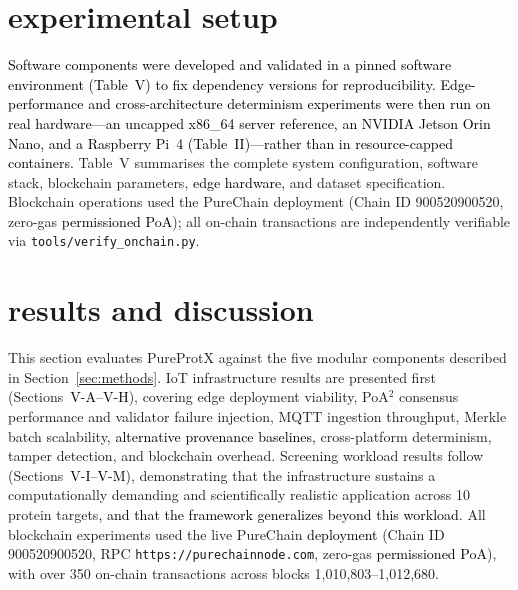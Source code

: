\documentclass[conference]{IEEEtran}
\begin{document}
\begin{table}[!htbp]
{\begin{tabular}{p{2.6cm} p{2.8cm} p{4.5cm}}
\bottomrule
\end{tabular}}
\end{table}
\section{\textbf{experimental setup}}
\label{sec:experiments}
\textcolor{black}{Software components were developed and validated in a pinned
software environment (Table~V) to fix dependency versions for reproducibility.
Edge-performance and cross-architecture determinism experiments were then run
on real hardware---an uncapped x86\_64 server reference, an NVIDIA Jetson
Orin Nano, and a Raspberry Pi~4 (Table~II)---rather than in resource-capped
containers.} Table~V summarises the complete system configuration, software
stack, blockchain parameters, \textcolor{black}{edge hardware,} and dataset
specification. Blockchain operations used the PureChain
deployment (Chain ID 900520900520, zero-gas \textcolor{black}{permissioned
PoA}); all on-chain transactions are independently verifiable via
\texttt{tools/verify\_onchain.py}.

\section{\textbf{results and discussion}}
\label{sec:results}

This section evaluates PureProtX against the five modular
components described in Section~\ref{sec:methods}.
IoT infrastructure results are presented first
(Sections~\textcolor{black}{V-A–V-H}), covering edge deployment viability,
PoA$^2$ consensus performance and validator failure injection, MQTT
ingestion throughput, Merkle batch scalability, \textcolor{black}{alternative
provenance baselines,} cross-platform determinism, tamper detection, and
blockchain overhead. Screening workload results follow
(Sections~\textcolor{black}{V-I–V-M}), demonstrating that the infrastructure
sustains a computationally demanding and scientifically realistic application
across 10 protein targets\textcolor{black}{, and that the framework
generalizes beyond this workload}.
All blockchain experiments used the live PureChain
\textcolor{black}{deployment} (Chain ID 900520900520, RPC
\texttt{https://purechainnode.com}, zero-gas
\textcolor{black}{permissioned PoA}), with over 350 on-chain transactions
across blocks 1,010,803–1,012,680.



\end{document}
